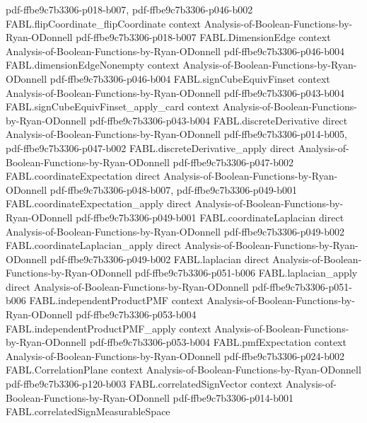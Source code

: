 \begin{theorem}
  {pdf-ffbe9c7b3306-p018-b007,
    pdf-ffbe9c7b3306-p046-b002}
\proofstep
  {FABL.flipCoordinate_flipCoordinate}
  {context}
  {Analysis-of-Boolean-Functions-by-Ryan-ODonnell}
  {pdf-ffbe9c7b3306-p018-b007}
\proofstep
  {FABL.DimensionEdge}
  {context}
  {Analysis-of-Boolean-Functions-by-Ryan-ODonnell}
  {pdf-ffbe9c7b3306-p046-b004}
\proofstep
  {FABL.dimensionEdgeNonempty}
  {context}
  {Analysis-of-Boolean-Functions-by-Ryan-ODonnell}
  {pdf-ffbe9c7b3306-p046-b004}
\proofstep
  {FABL.signCubeEquivFinset}
  {context}
  {Analysis-of-Boolean-Functions-by-Ryan-ODonnell}
  {pdf-ffbe9c7b3306-p043-b004}
\proofstep
  {FABL.signCubeEquivFinset_apply_card}
  {context}
  {Analysis-of-Boolean-Functions-by-Ryan-ODonnell}
  {pdf-ffbe9c7b3306-p043-b004}
\proofstep
  {FABL.discreteDerivative}
  {direct}
  {Analysis-of-Boolean-Functions-by-Ryan-ODonnell}
  {pdf-ffbe9c7b3306-p014-b005,
    pdf-ffbe9c7b3306-p047-b002}
\proofstep
  {FABL.discreteDerivative_apply}
  {direct}
  {Analysis-of-Boolean-Functions-by-Ryan-ODonnell}
  {pdf-ffbe9c7b3306-p047-b002}
\proofstep
  {FABL.coordinateExpectation}
  {direct}
  {Analysis-of-Boolean-Functions-by-Ryan-ODonnell}
  {pdf-ffbe9c7b3306-p048-b007,
    pdf-ffbe9c7b3306-p049-b001}
\proofstep
  {FABL.coordinateExpectation_apply}
  {direct}
  {Analysis-of-Boolean-Functions-by-Ryan-ODonnell}
  {pdf-ffbe9c7b3306-p049-b001}
\proofstep
  {FABL.coordinateLaplacian}
  {direct}
  {Analysis-of-Boolean-Functions-by-Ryan-ODonnell}
  {pdf-ffbe9c7b3306-p049-b002}
\proofstep
  {FABL.coordinateLaplacian_apply}
  {direct}
  {Analysis-of-Boolean-Functions-by-Ryan-ODonnell}
  {pdf-ffbe9c7b3306-p049-b002}
\proofstep
  {FABL.laplacian}
  {direct}
  {Analysis-of-Boolean-Functions-by-Ryan-ODonnell}
  {pdf-ffbe9c7b3306-p051-b006}
\proofstep
  {FABL.laplacian_apply}
  {direct}
  {Analysis-of-Boolean-Functions-by-Ryan-ODonnell}
  {pdf-ffbe9c7b3306-p051-b006}
\proofstep
  {FABL.independentProductPMF}
  {context}
  {Analysis-of-Boolean-Functions-by-Ryan-ODonnell}
  {pdf-ffbe9c7b3306-p053-b004}
\proofstep
  {FABL.independentProductPMF_apply}
  {context}
  {Analysis-of-Boolean-Functions-by-Ryan-ODonnell}
  {pdf-ffbe9c7b3306-p053-b004}
\proofstep
  {FABL.pmfExpectation}
  {context}
  {Analysis-of-Boolean-Functions-by-Ryan-ODonnell}
  {pdf-ffbe9c7b3306-p024-b002}
\proofstep
  {FABL.CorrelationPlane}
  {context}
  {Analysis-of-Boolean-Functions-by-Ryan-ODonnell}
  {pdf-ffbe9c7b3306-p120-b003}
\proofstep
  {FABL.correlatedSignVector}
  {context}
  {Analysis-of-Boolean-Functions-by-Ryan-ODonnell}
  {pdf-ffbe9c7b3306-p014-b001}
\proofstep
  {FABL.correlatedSignMeasurableSpace}

\end{theorem}
